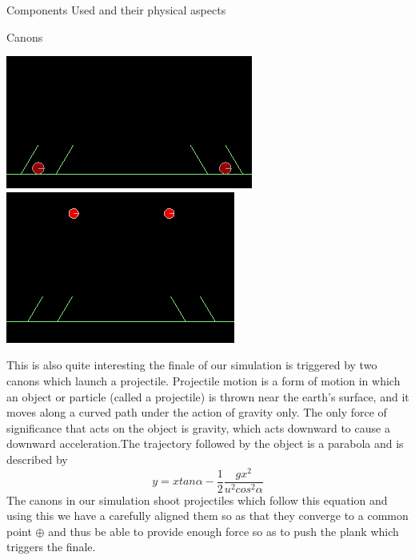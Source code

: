 \documentclass[a4paper,12pt]{article}
\begin{document}
\begin{section}{Components Used and their physical aspects}
\begin{subsection}{Canons}
\begin{center}
\includegraphics[scale=.35]{./Images/Cannon00.png}
\includegraphics[scale=.35]{./Images/Cannon01.png}
\end{center}
This is also quite interesting the finale of our simulation is triggered by  two canons which launch a projectile.
Projectile motion is a form of motion in which an object or particle (called a projectile) is thrown near the earth's surface, and it moves along a curved path under the action of gravity only. The only force of significance that acts on the object is gravity, which acts downward to cause a downward acceleration.The trajectory followed by the object is a parabola and is described by  
$$y = xtan\alpha - \frac{1}{2}\frac{g x^2}{u^2 cos^2 \alpha}$$
The canons in our simulation shoot projectiles which follow this equation and using this we have a
carefully aligned them so as that they converge to a common point $\oplus$ and thus be able to provide enough force so as to push the plank which triggers the finale.
\end{subsection}
\end {section}
\bigskip
\end{document}
